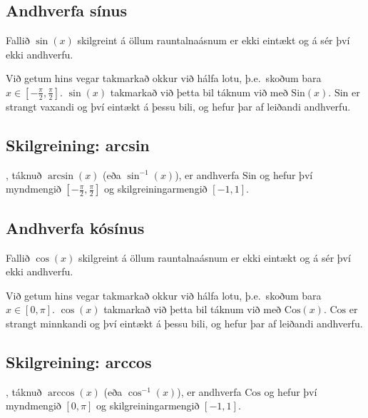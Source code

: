\documentclass[b5paper,10pt,icelandic]{sphinxmanual}
\begin{document}
\subsection{Andhverfa sínus}
\label{\detokenize{kafli04:andhverfa-sinus}}
Fallið \(\sin(x)\) skilgreint á öllum rauntalnaásnum er ekki eintækt
og á sér því ekki andhverfu.

Við getum hins vegar takmarkað okkur við hálfa lotu, þ.e. skoðum bara
\(x\in [-\frac \pi 2, \frac \pi 2]\). \(\sin(x)\) takmarkað við
þetta bil táknum við með \({{\text{Sin}}}(x)\).
\({{\text{Sin}}}\) er strangt vaxandi og því eintækt á þessu bili,
og hefur þar af leiðandi andhverfu.


\subsection{Skilgreining: arcsin}
\label{\detokenize{kafli04:skilgreining-arcsin}}
, táknuð \(\arcsin(x)\) (eða
\(\sin^{-1}(x)\)), er andhverfa \({{\text{Sin}}}\) og hefur því
myndmengið \([-\frac \pi 2,
\frac \pi 2]\) og skilgreiningarmengið \([-1,1]\).



\subsection{Andhverfa kósínus}
\label{\detokenize{kafli04:andhverfa-kosinus}}
Fallið \(\cos(x)\) skilgreint á öllum rauntalnaásnum er ekki eintækt
og á sér því ekki andhverfu.

Við getum hins vegar takmarkað okkur við hálfa lotu, þ.e. skoðum bara
\(x\in [0, \pi]\). \(\cos(x)\) takmarkað við þetta bil táknum
við með \({{\text{Cos}}}(x)\). \({{\text{Cos}}}\) er strangt
minnkandi og því eintækt á þessu bili, og hefur þar af leiðandi
andhverfu.


\subsection{Skilgreining: arccos}
\label{\detokenize{kafli04:skilgreining-arccos}}
, táknuð \(\arccos(x)\) (eða
\(\cos^{-1}(x)\)), er andhverfa \({{\text{Cos}}}\) og hefur því
myndmengið \([0,\pi]\) og skilgreiningarmengið \([-1,1]\).

\end{document}

